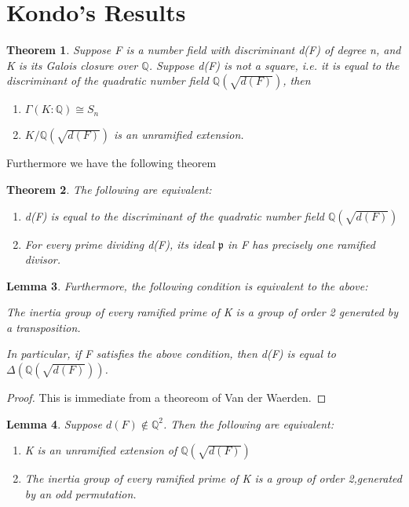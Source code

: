 \documentclass[preprint,12pt,reqno]{elsarticle}
\newtheorem{theorem}{Theorem}
\newtheorem{lemma}[theorem]{Lemma}
\begin{document}
\section{Kondo's Results}
\begin{theorem}
    Suppose F is a number field with discriminant d(F) of degree n, and K is its Galois closure over $\mathbb{Q}$. Suppose d(F) is not a square, i.e. it is equal to the discriminant of the quadratic number field $\mathbb{Q}(\sqrt{d(F)})$, then \begin{enumerate}
        \item $\Gamma(K:\mathbb{Q})\cong S_n$
        \item $K/\mathbb{Q}(\sqrt{d(F)})$ is an unramified extension.
    \end{enumerate}
\end{theorem}
Furthermore we have the following theorem \begin{theorem}
    The following are equivalent: \begin{enumerate}
        \item d(F) is equal to the discriminant of the quadratic number field $\mathbb{Q}(\sqrt{d(F)})$
        \item For every prime dividing d(F), its ideal $\mathfrak{p}$ in F has precisely one ramified divisor.
    \end{enumerate}
\end{theorem}
\begin{lemma}
Furthermore, the following condition is equivalent to the above:
\par
    The inertia group of every ramified prime of K is a group of order 2 generated by a transposition.\par
In particular, if F satisfies the above condition, then d(F) is equal to $\Delta(\mathbb{Q}(\sqrt{d(F)}))$.
\end{lemma}
\begin{proof}
This is immediate from a theoreom of Van der Waerden. 
\end{proof}
\begin{lemma}
Suppose $d(F)\notin \mathbb{Q}^2$. Then the following are equivalent:\begin{enumerate}
    \item K is an unramified extension of $\mathbb{Q}(\sqrt{d(F)})$
    \item The inertia group of every ramified prime of K is a group of order 2,generated by an odd permutation. 
\end{enumerate}
\end{lemma} 
\end{document}
